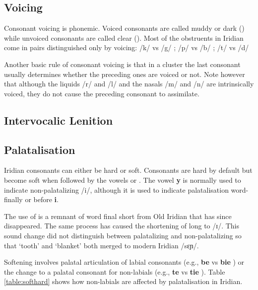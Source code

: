 \subsection{Voicing}
Consonant voicing is phonemic. Voiced consonants are called muddy or dark () while unvoiced consonants are called clear (). Most of the obstruents in Iridian come in pairs distinguished only by voicing: /k/  vs /g/ ; /p/  vs /b/ ; /t/  vs /d/  



Another basic rule of consonant voicing is that in a cluster the last consonant usually determines whether the preceding ones are voiced or not. Note however that although the liquids /r/ and /l/ and the nasals /m/ and /n/ are intrinsically voiced, they do not cause the preceding consonant to assimilate.

\ex
{}
\xe



\subsection{Intervocalic Lenition}




\subsection{Palatalisation}
\par Iridian consonants can either be hard or soft. Consonants are hard by default but become soft when followed by the vowels  or . The vowel \textbf{y} is normally used to indicate non-palatalizing /i/, although it is used to indicate palatalisation word-finally or before \textbf{i}.

\par The use of  is a remnant of word final short  from Old Iridian that has since disappeared. The same process has caused the shortening of long  to /ɪ/. This sound change did not distinguish between palatalizing and non-palatalizing  so that  `tooth' and  `blanket' both merged to modern Iridian  /sɛɲ/.

\par Softening involves palatal articulation of labial consonants (e.g., \textbf{be} \textipa{[bE]} vs \textbf{bie} \textipa{[b\sx{j}E]}) or the change to a palatal consonant for non-labials (e.g., \textbf{te} \textipa{[tE]} vs \textbf{tie} \textipa{[cE]}). Table \ref{table:softhard} shows how non-labials are affected by palatalisation in Iridian.

